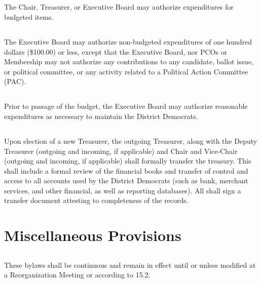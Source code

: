 \subsection{}
The Chair, Treasurer, or Executive Board may authorize expenditures for budgeted items.

\subsection{}
The Executive Board may authorize non-budgeted expenditures of one hundred dollars (\$100.00) or less, except that the Executive Board, nor PCOs or Membership may not authorize any contributions to any candidate, ballot issue, or political committee, or any activity related to a Political Action Committee (PAC).

\subsection{}
Prior to passage of the budget, the Executive Board may authorize reasonable expenditures as necessary to maintain the \fortythird{} District Democrats.

\subsection{}
Upon election of a new Treasurer, the outgoing Treasurer, along with the Deputy Treasurer (outgoing and incoming, if applicable) and Chair and Vice-Chair (outgoing and incoming, if applicable) shall formally transfer the treasury. This shall include a formal review of the financial books and transfer of control and access to all accounts used by the \fortythird{} District Democrats (such as bank, merchant services, and other financial, as well as reporting databases). All shall sign a transfer document attesting to completeness of the records.

\section{Miscellaneous Provisions}
\subsection{}
These bylaws shall be continuous and remain in effect until or unless modified at a Reorganization Meeting or according to 15.2.

